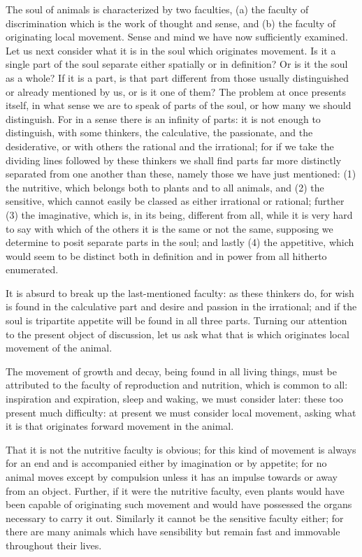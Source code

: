The soul of animals is characterized by two faculties, (a) the faculty
of discrimination which is the work of thought and sense, and (b)
the faculty of originating local movement. Sense and mind we have
now sufficiently examined. Let us next consider what it is in the
soul which originates movement. Is it a single part of the soul separate
either spatially or in definition? Or is it the soul as a whole? If
it is a part, is that part different from those usually distinguished
or already mentioned by us, or is it one of them? The problem at once
presents itself, in what sense we are to speak of parts of the soul,
or how many we should distinguish. For in a sense there is an infinity
of parts: it is not enough to distinguish, with some thinkers, the
calculative, the passionate, and the desiderative, or with others
the rational and the irrational; for if we take the dividing lines
followed by these thinkers we shall find parts far more distinctly
separated from one another than these, namely those we have just mentioned:
(1) the nutritive, which belongs both to plants and to all animals,
and (2) the sensitive, which cannot easily be classed as either irrational
or rational; further (3) the imaginative, which is, in its being,
different from all, while it is very hard to say with which of the
others it is the same or not the same, supposing we determine to posit
separate parts in the soul; and lastly (4) the appetitive, which would
seem to be distinct both in definition and in power from all hitherto
enumerated. 

It is absurd to break up the last-mentioned faculty: as these thinkers
do, for wish is found in the calculative part and desire and passion
in the irrational; and if the soul is tripartite appetite will be
found in all three parts. Turning our attention to the present object
of discussion, let us ask what that is which originates local movement
of the animal. 

The movement of growth and decay, being found in all living things,
must be attributed to the faculty of reproduction and nutrition, which
is common to all: inspiration and expiration, sleep and waking, we
must consider later: these too present much difficulty: at present
we must consider local movement, asking what it is that originates
forward movement in the animal. 

That it is not the nutritive faculty is obvious; for this kind of
movement is always for an end and is accompanied either by imagination
or by appetite; for no animal moves except by compulsion unless it
has an impulse towards or away from an object. Further, if it were
the nutritive faculty, even plants would have been capable of originating
such movement and would have possessed the organs necessary to carry
it out. Similarly it cannot be the sensitive faculty either; for there
are many animals which have sensibility but remain fast and immovable
throughout their lives. 

